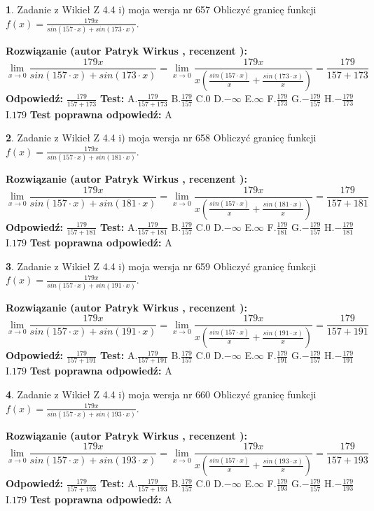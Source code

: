 \documentclass[12pt, a4paper]{article}
\theoremstyle{definition} %
\newtheorem{zad}{}
\newcommand{\zadStart}[1]{\begin{zad}#1\newline}
\newcommand{\zadStop}{\end{zad}}
\newcommand{\rozwStart}[2]{\noindent \textbf{Rozwiązanie (autor #1 , recenzent #2): }\newline}
\newcommand{\rozwStop}{\newline}
\newcommand{\odpStart}{\noindent \textbf{Odpowiedź:}\newline}
\newcommand{\odpStop}{\newline}
\newcommand{\testStart}{\noindent \textbf{Test:}\newline}
\newcommand{\testStop}{\newline}
\newcommand{\kluczStart}{\noindent \textbf{Test poprawna odpowiedź:}\newline}
\newcommand{\kluczStop}{\newline}
\begin{document}
\zadStart{Zadanie z Wikieł Z 4.4 i) moja wersja nr 657}
Obliczyć granicę funkcji $f(x)=\frac{179x}{sin(157\cdot x) +sin(173\cdot x)}$.
\zadStop
\rozwStart{Patryk Wirkus}{}
$$\lim\limits_{x\to 0}\frac{179x}{sin(157\cdot x) +sin(173\cdot x)}=\lim\limits_{x\to 0}\frac{179x}{x(\frac{sin(157\cdot x)}{x}+\frac{sin(173\cdot x)}{x})}=\frac{179}{157+173}$$
\rozwStop
\odpStart
$\frac{179}{157+173}$
\odpStop
\testStart
A.$\frac{179}{157+173}$
B.$\frac{179}{157}$
C.$0$
D.$-\infty$
E.$\infty$
F.$\frac{179}{173}$
G.$-\frac{179}{157}$
H.$-\frac{179}{173}$
I.$179$
\testStop
\kluczStart
A
\kluczStop



\zadStart{Zadanie z Wikieł Z 4.4 i) moja wersja nr 658}
Obliczyć granicę funkcji $f(x)=\frac{179x}{sin(157\cdot x) +sin(181\cdot x)}$.
\zadStop
\rozwStart{Patryk Wirkus}{}
$$\lim\limits_{x\to 0}\frac{179x}{sin(157\cdot x) +sin(181\cdot x)}=\lim\limits_{x\to 0}\frac{179x}{x(\frac{sin(157\cdot x)}{x}+\frac{sin(181\cdot x)}{x})}=\frac{179}{157+181}$$
\rozwStop
\odpStart
$\frac{179}{157+181}$
\odpStop
\testStart
A.$\frac{179}{157+181}$
B.$\frac{179}{157}$
C.$0$
D.$-\infty$
E.$\infty$
F.$\frac{179}{181}$
G.$-\frac{179}{157}$
H.$-\frac{179}{181}$
I.$179$
\testStop
\kluczStart
A
\kluczStop



\zadStart{Zadanie z Wikieł Z 4.4 i) moja wersja nr 659}
Obliczyć granicę funkcji $f(x)=\frac{179x}{sin(157\cdot x) +sin(191\cdot x)}$.
\zadStop
\rozwStart{Patryk Wirkus}{}
$$\lim\limits_{x\to 0}\frac{179x}{sin(157\cdot x) +sin(191\cdot x)}=\lim\limits_{x\to 0}\frac{179x}{x(\frac{sin(157\cdot x)}{x}+\frac{sin(191\cdot x)}{x})}=\frac{179}{157+191}$$
\rozwStop
\odpStart
$\frac{179}{157+191}$
\odpStop
\testStart
A.$\frac{179}{157+191}$
B.$\frac{179}{157}$
C.$0$
D.$-\infty$
E.$\infty$
F.$\frac{179}{191}$
G.$-\frac{179}{157}$
H.$-\frac{179}{191}$
I.$179$
\testStop
\kluczStart
A
\kluczStop



\zadStart{Zadanie z Wikieł Z 4.4 i) moja wersja nr 660}
Obliczyć granicę funkcji $f(x)=\frac{179x}{sin(157\cdot x) +sin(193\cdot x)}$.
\zadStop
\rozwStart{Patryk Wirkus}{}
$$\lim\limits_{x\to 0}\frac{179x}{sin(157\cdot x) +sin(193\cdot x)}=\lim\limits_{x\to 0}\frac{179x}{x(\frac{sin(157\cdot x)}{x}+\frac{sin(193\cdot x)}{x})}=\frac{179}{157+193}$$
\rozwStop
\odpStart
$\frac{179}{157+193}$
\odpStop
\testStart
A.$\frac{179}{157+193}$
B.$\frac{179}{157}$
C.$0$
D.$-\infty$
E.$\infty$
F.$\frac{179}{193}$
G.$-\frac{179}{157}$
H.$-\frac{179}{193}$
I.$179$
\testStop
\kluczStart
A
\kluczStop
\end{document}
